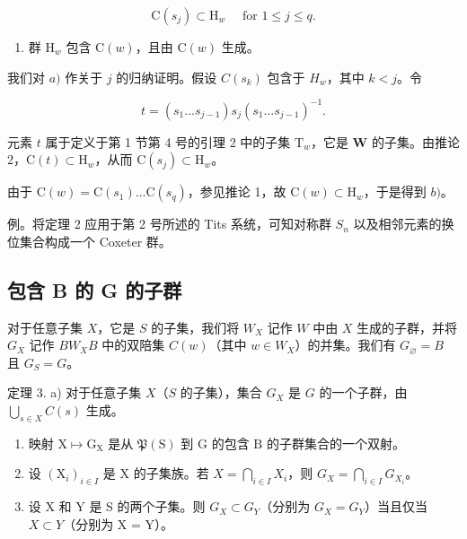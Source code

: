 \[
\mathrm{C} (s _ {j}) \subset \mathrm{H} _ {w} \quad \text { for } 1 \leqslant j \leqslant q.
\]

\begin{enumerate}
\def\labelenumi{\alph{enumi})}
\setcounter{enumi}{1}
\tightlist
\item
  群 \(\mathrm{H}_w\) 包含 \(\mathrm{C}(w)\)，且由 \(\mathrm{C}(w)\) 生成。
\end{enumerate}

我们对 \(a)\) 作关于 \(j\) 的归纳证明。假设 \(C(s_k)\) 包含于 \(H_w\)，其中 \(k < j\)。令

\[
t = (s _ {1} \dots s _ {j - 1}) s _ {j} (s _ {1} \dots s _ {j - 1}) ^ {- 1}.
\]

元素 \(t\) 属于定义于第 1 节第 4 号的引理 2 中的子集 \(\mathrm{T}_w\)，它是 \(\mathbf{W}\) 的子集。由推论 2，\(\mathrm{C}(t) \subset \mathrm{H}_w\)，从而 \(\mathrm{C}(s_j) \subset \mathrm{H}_w\)。

由于 \(\mathrm{C}(w) = \mathrm{C}(s_1) \ldots \mathrm{C}(s_q)\)，参见推论 1，故 \(\mathrm{C}(w) \subset \mathrm{H}_w\)，于是得到 \(b)\)。

例。将定理 2 应用于第 2 号所述的 Tits 系统，可知对称群 \(S_{n}\) 以及相邻元素的换位集合构成一个 Coxeter 群。

\subsection{包含 B 的 G 的子群}

对于任意子集 \(X\)，它是 \(S\) 的子集，我们将 \(W_X\) 记作 \(W\) 中由 \(X\) 生成的子群，并将 \(G_X\) 记作 \(BW_X B\) 中的双陪集 \(C(w)\)（其中 \(w \in W_X\)）的并集。我们有 \(G_\varnothing = B\) 且 \(G_S = G\)。

定理 3. a) 对于任意子集 \(X\)（\(S\) 的子集），集合 \(G_X\) 是 \(G\) 的一个子群，由 \(\bigcup_{s \in X} C(s)\) 生成。

\begin{enumerate}
\def\labelenumi{\alph{enumi})}
\setcounter{enumi}{1}
\item
  映射 \(\mathrm{X} \mapsto \mathrm{G}_{\mathrm{X}}\) 是从 \(\mathfrak{P}(\mathrm{S})\) 到 \(\mathrm{G}\) 的包含 \(\mathrm{B}\) 的子群集合的一个双射。
\item
  设 \((\mathrm{X}_i)_{i\in I}\) 是 X 的子集族。若 \(X = \bigcap_{i\in I}X_i\)，则 \(G_X = \bigcap_{i\in I}G_{X_i}\)。
\item
  设 X 和 Y 是 S 的两个子集。则 \(G_{X} \subset G_{Y}\)（分别为 \(G_{X} = G_{Y}\)）当且仅当 \(X \subset Y\)（分别为 X = Y）。
\end{enumerate}

